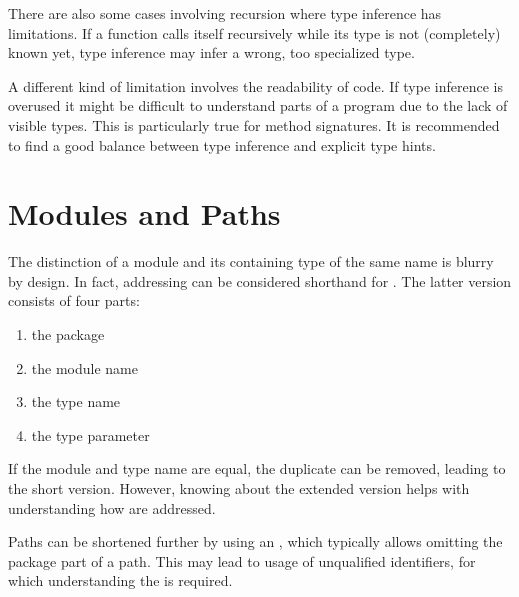 There are also some cases involving recursion where type inference has limitations. If a function calls itself recursively while its type is not (completely) known yet, type inference may infer a wrong, too specialized type.

A different kind of limitation involves the readability of code. If type inference is overused it might be difficult to understand parts of a program due to the lack of visible types. This is particularly true for method signatures. It is recommended to find a good balance between type inference and explicit type hints.


\section{Modules and Paths}
\label{type-system-modules-and-paths}


The distinction of a module and its containing type of the same name is blurry by design. In fact, addressing  can be considered shorthand for . The latter version consists of four parts:

\begin{enumerate}
	\item the package 
	\item the module name 
	\item the type name 
	\item the type parameter 
\end{enumerate}
If the module and type name are equal, the duplicate can be removed, leading to the  short version. However, knowing about the extended version helps with understanding how  are addressed.

Paths can be shortened further by using an , which typically allows omitting the package part of a path. This may lead to usage of unqualified identifiers, for which understanding the  is required.



